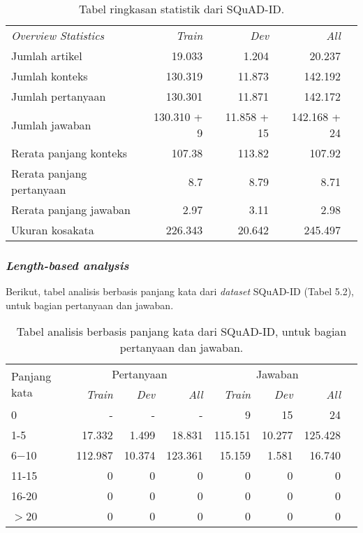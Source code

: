 \begin{table}[H]\centering
\begin{tabular}{lrrrr}\toprule
\emph{Overview Statistics} &\emph{Train} &\emph{Dev} &\emph{All} \\
Jumlah artikel &19.033 &1.204 &20.237 \\
Jumlah konteks &130.319 &11.873 &142.192 \\
Jumlah pertanyaan &130.301 &11.871 &142.172 \\
Jumlah jawaban &130.310 + 9 &11.858 + 15 &142.168 + 24 \\
Rerata panjang konteks &107.38 &113.82 &107.92 \\
Rerata panjang pertanyaan &8.7 &8.79 &8.71 \\
Rerata panjang jawaban &2.97 &3.11 &2.98 \\
Ukuran kosakata &226.343 &20.642 &245.497 \\
\bottomrule
\end{tabular}
\caption{Tabel ringkasan statistik dari SQuAD-ID.}
\end{table}

\subsubsection{\emph{Length-based analysis}}

Berikut, tabel analisis berbasis panjang kata dari \emph{dataset} SQuAD-ID (Tabel 5.2), untuk bagian pertanyaan dan jawaban.

\begin{table}[H]\centering
\begin{tabular}{lrrrrrrr}\toprule
\multirow{2}{*}{Panjang kata} &\multicolumn{3}{c}{Pertanyaan} &\multicolumn{3}{c}{Jawaban} \\\cmidrule{2-7}
&\emph{Train} &\emph{Dev} &\emph{All} &\emph{Train} &\emph{Dev} &\emph{All} \\\midrule
0 &- &- &- &9 &15 &24 \\
1-5 &17.332 &1.499 &18.831 &115.151 &10.277 &125.428 \\
6$-$10 &112.987 &10.374 &123.361 &15.159 &1.581 &16.740 \\
11-15 &0 &0 &0 &0 &0 &0 \\
16-20 &0 &0 &0 &0 &0 &0 \\
$>$20 &0 &0 &0 &0 &0 &0 \\
\bottomrule
\end{tabular}
\caption{Tabel analisis berbasis panjang kata dari SQuAD-ID, untuk bagian pertanyaan dan jawaban.}
\end{table}

